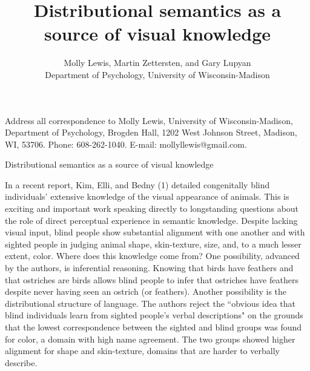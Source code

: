 \documentclass[12pt]{article}
\title{\normalsize Distributional semantics as a source of visual knowledge}
\author{\normalsize  Molly Lewis, Martin Zettersten, and Gary Lupyan \protect\\  \normalsize Department of Psychology, University of Wisconsin-Madison}
\date{}
\begin{document}
 
\maketitle
\vfill 
{\noindent Address all correspondence to Molly  Lewis, University of Wisconsin-Madison, Department of Psychology, Brogden Hall, 1202 West Johnson Street, Madison, WI, 53706. Phone: 608-262-1040. E-mail: mollyllewis@gmail.com.\par}
\newpage


\begin{center} 
Distributional semantics as a source of visual knowledge 
\end{center}

\vspace{1\baselineskip}

In a recent report, Kim, Elli, and Bedny (1) detailed congenitally blind individuals’ extensive knowledge of the visual appearance of animals. This is exciting and important work speaking directly to longstanding questions about the role of direct perceptual experience in semantic knowledge. Despite lacking visual input, blind people show substantial alignment with one another and with sighted people in judging animal shape, skin-texture, size, and, to a much lesser extent, color. Where does this knowledge come from? One possibility, advanced by the authors, is inferential reasoning. Knowing that birds have feathers and that ostriches are birds allows blind people to infer that ostriches have feathers despite never having seen an ostrich (or feathers). Another possibility is the distributional structure of language. The authors reject the ``obvious idea that blind individuals learn from sighted people's verbal descriptions" on the grounds that the lowest correspondence between the sighted and blind groups was found for color, a domain with high name agreement. The two groups showed higher alignment for shape and skin-texture, domains that are harder to verbally describe. 
\end{document}
